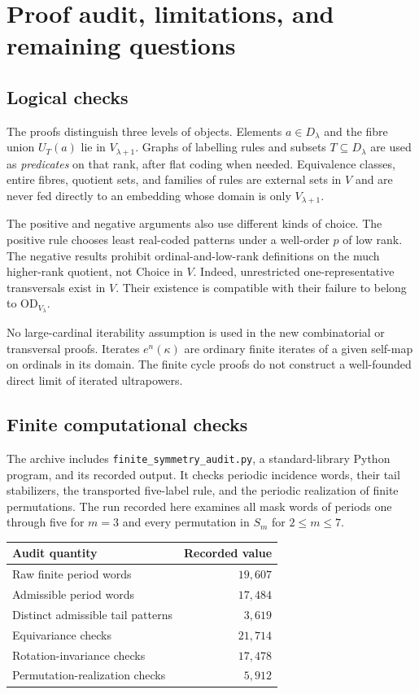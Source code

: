 \documentclass[11pt,letterpaper]{article}
\theoremstyle{definition}
\numberwithin{equation}{section}
\newcommand{\OD}{\mathrm{OD}}
\begin{document}
\section{Proof audit, limitations, and remaining questions}\label{sec:limits}

\subsection{Logical checks}

The proofs distinguish three levels of objects. Elements $a\in D_\lambda$ and the fibre union $U_T(a)$ lie in $V_{\lambda+1}$. Graphs of labelling rules and subsets $T\subseteq D_\lambda$ are used as \emph{predicates} on that rank, after flat coding when needed. Equivalence classes, entire fibres, quotient sets, and families of rules are external sets in $V$ and are never fed directly to an embedding whose domain is only $V_{\lambda+1}$.

The positive and negative arguments also use different kinds of choice. The positive rule chooses least real-coded patterns under a well-order $p$ of low rank. The negative results prohibit ordinal-and-low-rank definitions on the much higher-rank quotient, not Choice in $V$. Indeed, unrestricted one-representative transversals exist in $V$. Their existence is compatible with their failure to belong to $\OD_{V_\lambda}$.

No large-cardinal iterability assumption is used in the new combinatorial or transversal proofs. Iterates $e^n(\kappa)$ are ordinary finite iterates of a given self-map on ordinals in its domain. The finite cycle proofs do not construct a well-founded direct limit of iterated ultrapowers.

\subsection{Finite computational checks}

The archive includes \nolinkurl{finite_symmetry_audit.py}, a standard-library Python program, and its recorded output. It checks periodic incidence words, their tail stabilizers, the transported five-label rule, and the periodic realization of finite permutations. The run recorded here examines all mask words of periods one through five for $m=3$ and every permutation in $S_m$ for $2\le m\le7$.

\begin{center}
\begin{tabular}{@{}lr@{}}
\toprule
Audit quantity & Recorded value \\
\midrule
Raw finite period words & $19{,}607$ \\
Admissible period words & $17{,}484$ \\
Distinct admissible tail patterns & $3{,}619$ \\
Equivariance checks & $21{,}714$ \\
Rotation-invariance checks & $17{,}478$ \\
Permutation-realization checks & $5{,}912$ \\
\bottomrule
\end{tabular}
\end{center}
\end{document}
